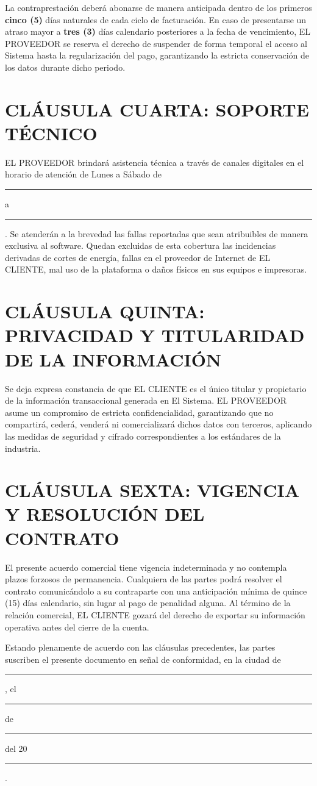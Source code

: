 \documentclass[10pt,a4paper]{article}
\begin{document}
La contraprestación deberá abonarse de manera anticipada dentro de los primeros \textbf{cinco (5)} días naturales de cada ciclo de facturación. En caso de presentarse un atraso mayor a \textbf{tres (3)} días calendario posteriores a la fecha de vencimiento, EL PROVEEDOR se reserva el derecho de suspender de forma temporal el acceso al Sistema hasta la regularización del pago, garantizando la estricta conservación de los datos durante dicho periodo.

\section*{CLÁUSULA CUARTA: SOPORTE TÉCNICO}
EL PROVEEDOR brindará asistencia técnica a través de canales digitales en el horario de atención de Lunes a Sábado de \rule{1cm}{0.4pt} a \rule{1cm}{0.4pt}. Se atenderán a la brevedad las fallas reportadas que sean atribuibles de manera exclusiva al software. Quedan excluidas de esta cobertura las incidencias derivadas de cortes de energía, fallas en el proveedor de Internet de EL CLIENTE, mal uso de la plataforma o daños físicos en sus equipos e impresoras.

\section*{CLÁUSULA QUINTA: PRIVACIDAD Y TITULARIDAD DE LA INFORMACIÓN}
Se deja expresa constancia de que EL CLIENTE es el único titular y propietario de la información transaccional generada en El Sistema. EL PROVEEDOR asume un compromiso de estricta confidencialidad, garantizando que no compartirá, cederá, venderá ni comercializará dichos datos con terceros, aplicando las medidas de seguridad y cifrado correspondientes a los estándares de la industria.

\section*{CLÁUSULA SEXTA: VIGENCIA Y RESOLUCIÓN DEL CONTRATO}
El presente acuerdo comercial tiene vigencia indeterminada y no contempla plazos forzosos de permanencia. Cualquiera de las partes podrá resolver el contrato comunicándolo a su contraparte con una anticipación mínima de quince (15) días calendario, sin lugar al pago de penalidad alguna. Al término de la relación comercial, EL CLIENTE gozará del derecho de exportar su información operativa antes del cierre de la cuenta.

\vspace{10pt}
Estando plenamente de acuerdo con las cláusulas precedentes, las partes suscriben el presente documento en señal de conformidad, en la ciudad de \rule{2.5cm}{0.4pt}, el \rule{1cm}{0.4pt} de \rule{2cm}{0.4pt} del 20\rule{1cm}{0.4pt}.
\end{document}
